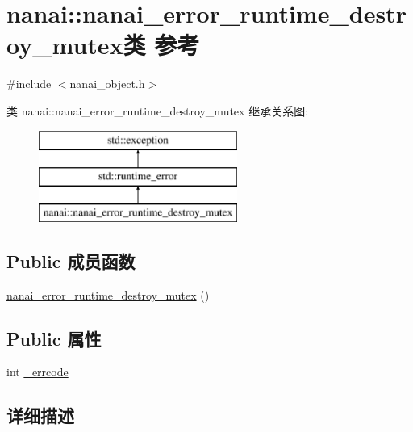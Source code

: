 \hypertarget{classnanai_1_1nanai__error__runtime__destroy__mutex}{}\section{nanai\+:\+:nanai\+\_\+error\+\_\+runtime\+\_\+destroy\+\_\+mutex类 参考}
\label{classnanai_1_1nanai__error__runtime__destroy__mutex}


{\ttfamily \#include $<$nanai\+\_\+object.\+h$>$}

类 nanai\+:\+:nanai\+\_\+error\+\_\+runtime\+\_\+destroy\+\_\+mutex 继承关系图\+:\begin{figure}[H]
\begin{center}
\leavevmode
\includegraphics[height=3.000000cm]{classnanai_1_1nanai__error__runtime__destroy__mutex}
\end{center}
\end{figure}
\subsection*{Public 成员函数}
\begin{DoxyCompactItemize}
\item 
\hyperlink{classnanai_1_1nanai__error__runtime__destroy__mutex_a8cf012bdc03827ba61f3d3825c9c3ee4}{nanai\+\_\+error\+\_\+runtime\+\_\+destroy\+\_\+mutex} ()
\end{DoxyCompactItemize}
\subsection*{Public 属性}
\begin{DoxyCompactItemize}
\item 
int \hyperlink{classnanai_1_1nanai__error__runtime__destroy__mutex_a8d75df933f0f165a5d9ee57173c3dd21}{\+\_\+errcode}
\end{DoxyCompactItemize}


\subsection{详细描述}


